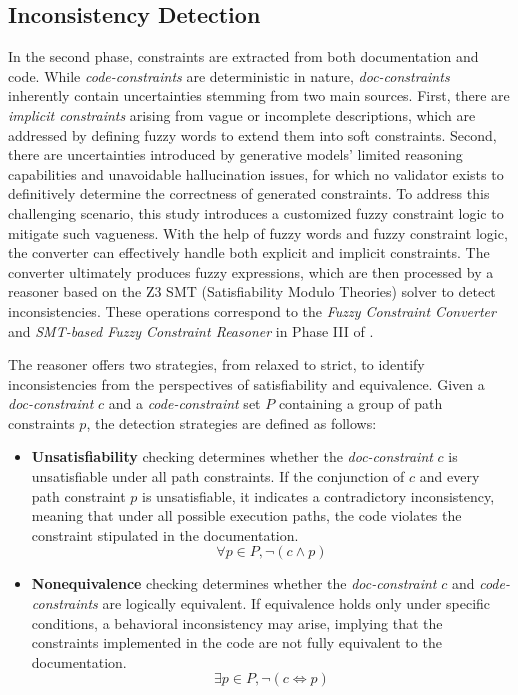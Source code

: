 \subsection{Inconsistency Detection}\label{sec:detect-mpchecker}

In the second phase, constraints are extracted from both documentation and code. While \emph{code-constraints} are deterministic in nature, \emph{doc-constraints} inherently contain uncertainties stemming from two main sources. First, there are \emph{implicit constraints} arising from vague or incomplete descriptions, which are addressed by defining fuzzy words to extend them into soft constraints. Second, there are uncertainties introduced by generative models' limited reasoning capabilities and unavoidable hallucination issues, for which no validator exists to definitively determine the correctness of generated constraints. To address this challenging scenario, this study introduces a customized fuzzy constraint logic to mitigate such vagueness. With the help of fuzzy words and fuzzy constraint logic, the converter can effectively handle both explicit and implicit constraints. The converter ultimately produces fuzzy expressions, which are then processed by a reasoner based on the Z3 SMT (Satisfiability Modulo Theories) solver to detect inconsistencies. These operations correspond to the \textit{Fuzzy Constraint Converter} and \textit{SMT-based Fuzzy Constraint Reasoner} in Phase III of .


The reasoner offers two strategies, from relaxed to strict, to identify inconsistencies from the perspectives of satisfiability and equivalence. Given a \emph{doc-constraint} $c$ and a \emph{code-constraint} set $P$ containing a group of path constraints $p$, the detection strategies are defined as follows:
\begin{itemize}
	\item \textbf{Unsatisfiability} checking determines whether the \emph{doc-constraint} $c$ is unsatisfiable under all path constraints. If the conjunction of $c$ and every path constraint $p$ is unsatisfiable, it indicates a contradictory inconsistency, meaning that under all possible execution paths, the code violates the constraint stipulated in the documentation.
	\begin{equation}\label{eq:uq1}
		\forall p \in P, \neg (c \wedge p)
	\end{equation}
	\item \textbf{Nonequivalence} checking determines whether the \emph{doc-constraint} $c$ and \emph{code-constraints} are logically equivalent. If equivalence holds only under specific conditions, a behavioral inconsistency may arise, implying that the constraints implemented in the code are not fully equivalent to the documentation.
	\begin{equation}\label{eq:uq3}
		\exists p \in P, \neg (c \Leftrightarrow p)
	\end{equation}
\end{itemize}

